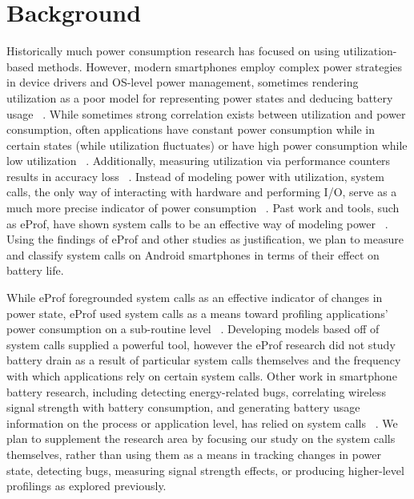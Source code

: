 \documentclass[11pt]{article}
\begin{document}
\section{Background}

Historically much power consumption research has focused on using utilization-based
methods.  However, modern smartphones employ complex power strategies in device 
drivers and OS-level power management, sometimes rendering utilization as a poor 
model for representing power states and deducing battery usage ~\cite{pathak-systemcall}.  While 
sometimes strong correlation exists between utilization and power consumption, often 
applications have constant power consumption while in certain states (while 
utilization fluctuates) or have high power consumption while low utilization ~\cite{pathak-systemcall,google-androiddev}.  
Additionally, measuring utilization via performance counters results in accuracy 
loss ~\cite{pathak-systemcall}.  Instead of modeling power with utilization, system calls, the only way of 
interacting with hardware and performing I/O, serve as a much more precise indicator 
of power consumption ~\cite{pathak-systemcall}.  Past work and tools, such as eProf, have shown system 
calls to be an effective way of modeling power ~\cite{pathak-systemcall,yoon-appscope,pathak-eprof,ding-signals}.  Using the findings 
of eProf and other studies as justification, we plan to measure and classify system 
calls on Android smartphones in terms of their effect on battery life.

While eProf foregrounded system calls as an effective indicator of changes in power
state, eProf used system calls as a means toward profiling applications' power 
consumption on a sub-routine level ~\cite{pathak-systemcall,pathak-eprof}.  Developing models based off of system 
calls supplied a powerful tool, however the eProf research did not study battery drain 
as a result of  particular system calls themselves and the frequency with which 
applications rely on certain system calls.  Other work in smartphone battery 
research, including detecting energy-related bugs, correlating wireless signal strength 
with battery consumption, and generating battery usage information on the process or 
application level, has relied on system calls ~\cite{yoon-appscope,pathak-bugs,ding-signals}.  We plan to supplement the 
research area by focusing our study on the system calls themselves, rather than using 
them as a means in tracking changes in power state, detecting bugs, measuring signal 
strength effects, or producing higher-level profilings as explored previously.
\end{document}
